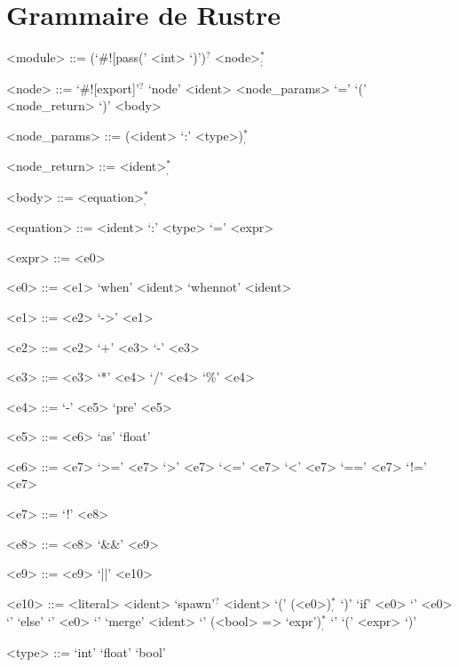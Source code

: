 \documentclass{scrartcl}
\begin{document}
\section{Grammaire de Rustre}
\begin{grammar}
  <module> ::= (`#![pass(' <int> `)')${}^?$ <node>${}^*_;$

  <node> ::= `#![export]'${}^?$ `node' <ident> <node\_params> `=' `(' <node\_return> `)' <body>

  <node\_params> ::= (<ident> `:' <type>)${}^*_,$

  <node\_return> ::= <ident>${}^*_,$

  <body> ::= <equation>${}^*_,$

  <equation> ::= <ident> `:' <type> `=' <expr>

  <expr> ::= <e0>

  <e0> ::= <e1> `when' <ident>
   `whennot' <ident>

  <e1> ::= <e2> `->' <e1>

  <e2> ::= <e2> `+' <e3>
   `-' <e3>

  <e3> ::= <e3> `*' <e4>
   `/' <e4>
   `\%' <e4>

  <e4> ::= `-' <e5>
  \alt `pre' <e5>

  <e5> ::= <e6> `as' `float'

  <e6> ::= <e7> `>=' <e7>
   `>' <e7>
   `<=' <e7>
   `<' <e7>
   `==' <e7>
   `!=' <e7>

  <e7> ::= `!' <e8>

  <e8> ::= <e8> `&&' <e9>

  <e9> ::= <e9> `||' <e10>

  <e10> ::= <literal>
  \alt <ident>
  \alt `spawn'$^?$ <ident> `(' (<e0>)${}^*_,$ `)'
  \alt `if' <e0> `{' <e0> `}' `else' `{' <e0> `}'
  \alt `merge' <ident> `{' (<bool> => `expr')${}^*_,$ `}'
  \alt `(' <expr> `)'

  <type> ::= `int'
  \alt `float'
  \alt `bool'
\end{grammar}
\end{document}
